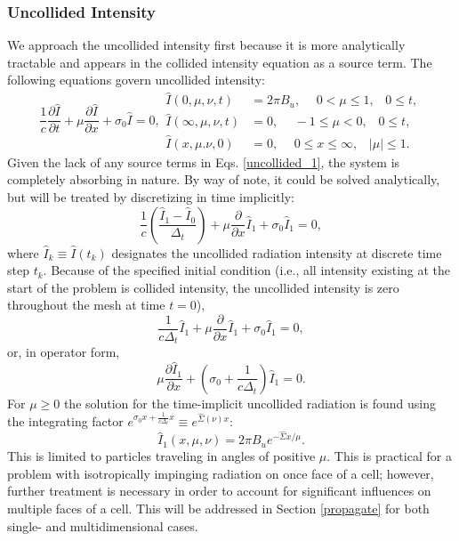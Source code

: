 \subsubsection{Uncollided Intensity}
We approach the uncollided intensity first
because it is more analytically tractable and appears in the collided intensity
equation as a source term. The
following equations govern uncollided intensity:
\begin{subequations} \label{uncollided_1}
\begin{equation}
\frac{1}{c}\frac{\partial\hat I}{\partial t} + \mu\frac{\partial\hat
  I}{\partial x} + \sigma_0\hat I = 0,
\end{equation}
\begin{align}
\hat I(0,\mu,\nu,t)&=2\pi B_u,\hspace{15pt} 0<\mu\leq1, \hspace{10pt}0\leq t,\\
\hat I(\infty,\mu,\nu,t)&=0,\hspace{15pt} -1\leq\mu<0,\hspace{10pt}0\leq t,\\
\hat I(x,\mu.\nu,0)&=0, \hspace{15pt}0\leq x\leq\infty,\hspace{10pt}|\mu|\leq1.
\end{align}
\end{subequations}
Given the lack of any source terms in Eqs. \eqref{uncollided_1}, the
system is completely absorbing in nature.  By way of note, it could be solved
analytically, but will be treated by discretizing in time implicitly:
\[ \frac{1}{c}\left(\frac{\hat I_1-\hat I_0}{\Delta_t}\right) +
  \mu\frac{\partial}{\partial x}\hat I_1 + \sigma_0\hat I_1=0,\]
where $\hat I_k\equiv\hat I(t_k)$ designates the uncollided radiation intensity
at discrete time step $t_k$.  Because of the specified initial condition (i.e.,
all intensity existing at the start of the problem is collided
intensity, the uncollided intensity is zero throughout the mesh at time
$t=0$),
\[\frac{1}{c\Delta_t}{\hat I_1} + \mu\frac{\partial}{\partial x}\hat
I_1 + \sigma_0\hat I_1=0,\]
or, in operator form,
\begin{equation}
\mu\frac{\partial\hat I_1}{\partial x} +
  \left(\sigma_0+\frac{1}{c\Delta_t}\right)\hat I_1 = 0 \label{uncol_ode}.
\end{equation}
For $\mu\geq0$ the solution for the time-implicit uncollided radiation is found
using the integrating factor $e^{\sigma_0x+\frac{1}{c\Delta_t}x}\equiv
e^{\hat\Sigma(\nu)x}$:
\begin{equation}
\hat I_1(x,\mu,\nu)=2\pi B_ue^{-\hat\Sigma x/\mu} \label{uncol_solve}.
\end{equation}
This is limited to particles traveling in angles of positive $\mu$.  This is
practical for a problem with isotropically impinging radiation on once face
of a cell; however, further treatment is necessary in order to
account for significant influences on multiple faces of a cell.  This will be
addressed in Section \ref{propagate} for both single- and multidimensional
cases.

